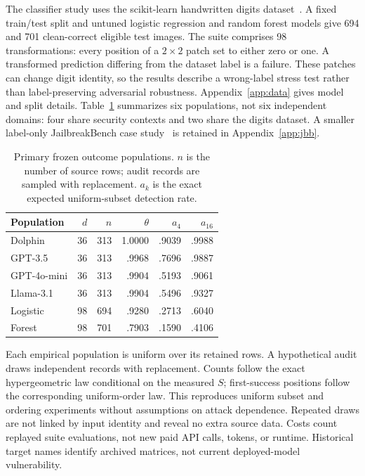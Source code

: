\documentclass[conference]{IEEEtran}
\begin{document}
The classifier study uses the scikit-learn handwritten digits dataset~\cite{sklearn,digits}. A fixed train/test split and untuned logistic regression and random forest models give 694 and 701 clean-correct eligible test images. The suite comprises 98 transformations: every position of a $2\times2$ patch set to either zero or one. A transformed prediction differing from the dataset label is a failure. These patches can change digit identity, so the results describe a wrong-label stress test rather than label-preserving adversarial robustness. Appendix~\ref{app:data} gives model and split details. Table~\ref{tab:populations} summarizes six populations, not six independent domains: four share security contexts and two share the digits dataset. A smaller label-only JailbreakBench case study~\cite{jbb,artifacts} is retained in Appendix~\ref{app:jbb}.

\begin{table}[t]
\caption{Primary frozen outcome populations. $n$ is the number of source rows; audit records are sampled with replacement. $a_k$ is the exact expected uniform-subset detection rate.}\label{tab:populations}
\centering
\begin{tabular}{lrrrrr}
\toprule
Population&$d$&$n$&$\theta$&$a_4$&$a_{16}$\\
\midrule
Dolphin&36&313&1.0000&.9039&.9988\\
GPT-3.5&36&313&.9968&.7696&.9887\\
GPT-4o-mini&36&313&.9904&.5193&.9061\\
Llama-3.1&36&313&.9904&.5496&.9327\\
Logistic&98&694&.9280&.2713&.6040\\
Forest&98&701&.7903&.1590&.4106\\
\bottomrule
\end{tabular}
\end{table}

Each empirical population is uniform over its retained rows. A hypothetical audit draws independent records with replacement. Counts follow the exact hypergeometric law conditional on the measured $S$; first-success positions follow the corresponding uniform-order law. This reproduces uniform subset and ordering experiments without assumptions on attack dependence. Repeated draws are not linked by input identity and reveal no extra source data. Costs count replayed suite evaluations, not new paid API calls, tokens, or runtime. Historical target names identify archived matrices, not current deployed-model vulnerability.
\end{document}
